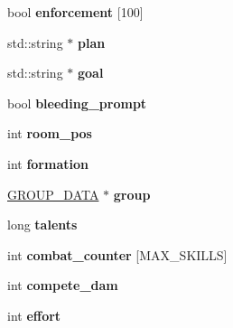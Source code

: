 \begin{DoxyCompactItemize}
\item 
\hypertarget{structchar__data_a844301eaae89b0267693fa6837cae4fd}{bool {\bfseries enforcement} \mbox{[}100\mbox{]}}\label{structchar__data_a844301eaae89b0267693fa6837cae4fd}

\item 
\hypertarget{structchar__data_ab97679ebd920365337234d72006ff87e}{std\-::string $\ast$ {\bfseries plan}}\label{structchar__data_ab97679ebd920365337234d72006ff87e}

\item 
\hypertarget{structchar__data_ac4261577d4f621e927d0ec1243c1253f}{std\-::string $\ast$ {\bfseries goal}}\label{structchar__data_ac4261577d4f621e927d0ec1243c1253f}

\item 
\hypertarget{structchar__data_ab1c479546fbe29024d02cfa8724ee239}{bool {\bfseries bleeding\-\_\-prompt}}\label{structchar__data_ab1c479546fbe29024d02cfa8724ee239}

\item 
\hypertarget{structchar__data_a16f2e5a250dcb85bf7ecc513c6356645}{int {\bfseries room\-\_\-pos}}\label{structchar__data_a16f2e5a250dcb85bf7ecc513c6356645}

\item 
\hypertarget{structchar__data_ab5831dabd736ba9be7a6ef131004cdba}{int {\bfseries formation}}\label{structchar__data_ab5831dabd736ba9be7a6ef131004cdba}

\item 
\hypertarget{structchar__data_a4456209f640df5a6487031c9d3849844}{\hyperlink{structgroup__data}{G\-R\-O\-U\-P\-\_\-\-D\-A\-T\-A} $\ast$ {\bfseries group}}\label{structchar__data_a4456209f640df5a6487031c9d3849844}

\item 
\hypertarget{structchar__data_a7b40267243e864898ae2efc441491c53}{long {\bfseries talents}}\label{structchar__data_a7b40267243e864898ae2efc441491c53}

\item 
\hypertarget{structchar__data_a55974ffbe7497a20a925af20f32c963e}{int {\bfseries combat\-\_\-counter} \mbox{[}M\-A\-X\-\_\-\-S\-K\-I\-L\-L\-S\mbox{]}}\label{structchar__data_a55974ffbe7497a20a925af20f32c963e}

\item 
\hypertarget{structchar__data_a000b4b9bc4f3707e65cd1881afae5b22}{int {\bfseries compete\-\_\-dam}}\label{structchar__data_a000b4b9bc4f3707e65cd1881afae5b22}

\item 
\hypertarget{structchar__data_a18becfa8b0136451c576a20f7686005d}{int {\bfseries effort}}\label{structchar__data_a18becfa8b0136451c576a20f7686005d}


\end{DoxyCompactItemize}

